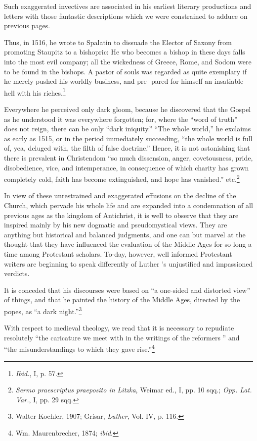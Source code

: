 Such exaggerated invectives are associated in his earliest literary productions
and letters with those fantastic descriptions which we were constrained
to adduce on previous pages.

Thus, in 1516, he wrote to Spalatin to dissuade the Elector of Saxony
from promoting Staupitz to a bishopric: He who becomes a bishop in these
days falls into the most evil company; all the wickedness of Greece, Rome,
and Sodom were to be found in the bishops. A pastor of souls was regarded
as quite exemplary if he merely pushed his worldly business, and pre-
pared for himself an insatiable hell with his riches.\footnote{\textit{Ibid.}, I, p. 57.}

Everywhere he perceived only dark gloom, because he discovered that
the Gospel as he understood it was everywhere forgotten; for, where the
“word of truth” does not reign, there can be only “dark iniquity.” “The
whole world,” he exclaims as early as 1515, or in the period immediately
succeeding, “the whole world is full of, yea, deluged with, the filth of false
doctrine.” Hence, it is not astonishing that there is prevalent in Christendom
“so much dissension, anger, covetousness, pride, disobedience, vice, and
intemperance, in consequence of which charity has grown completely cold,
faith has become extinguished, and hope has vanished.” etc.\footnote
{\textit{Sermo praescriptus praeposito in Litzka}, Weimar ed., I, pp. 10 sqq.; \textit{Opp. Lat. Var.}, I,
pp. 29 sqq.}

In view of these unrestrained and exaggerated effusions on the
decline of the Church, which pervade his whole life and are expanded into
a condemnation of all previous ages as the kingdom
of Antichrist, it is well to observe that they are inspired mainly by
his new dogmatic and pseudomystical views. They are anything but
historical and balanced judgments, and one can but marvel at the
thought that they have influenced the evaluation of the Middle
Ages for so long a time among Protestant scholars. To-day, however, well
informed Protestant writers are beginning to speak differently of Luther
’s unjustified and impassioned verdicts.

It is conceded that his discourses were based on “a one-sided and distorted
view” of things, and that he painted the history of the Middle Ages,
directed by the popes, as “a dark night.”\footnote
{Walter Koehler, 1907; Grisar, \textit{Luther}, Vol. IV, p. 116.}

With respect to medieval theology, we read that it is necessary to repudiate
resolutely “the caricature we meet with in the writings of the reformers
” and “the misunderstandings to which they gave rise.”\footnote
{Wm. Maurenbrecher, 1874; \textit{ibid}.}

